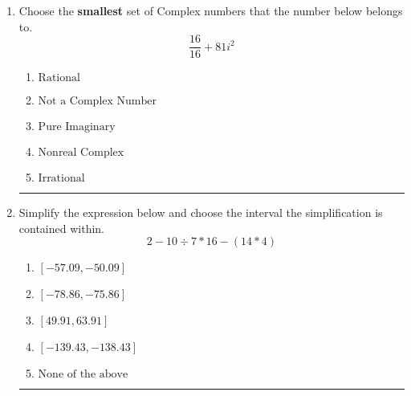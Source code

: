 \documentclass[14pt]{extbook}
\newcommand{\litem}[1]{\item#1\hspace*{-1cm}\rule{\textwidth}{0.4pt}}
\begin{document}
\begin{enumerate}
{\begin{enumerate}[label=\Alph*.]
\end{enumerate} }
\litem{
Choose the \textbf{smallest} set of Complex numbers that the number below belongs to.\[ \frac{16}{16}+81i^2 \]\begin{enumerate}[label=\Alph*.]
\item \( \text{Rational} \)
\item \( \text{Not a Complex Number} \)
\item \( \text{Pure Imaginary} \)
\item \( \text{Nonreal Complex} \)
\item \( \text{Irrational} \)

\end{enumerate} }
\litem{
Simplify the expression below and choose the interval the simplification is contained within.\[ 2 - 10 \div 7 * 16 - (14 * 4) \]\begin{enumerate}[label=\Alph*.]
\item \( [-57.09, -50.09] \)
\item \( [-78.86, -75.86] \)
\item \( [49.91, 63.91] \)
\item \( [-139.43, -138.43] \)
\item \( \text{None of the above} \)

\end{enumerate} }
\end{enumerate}
\end{document}
